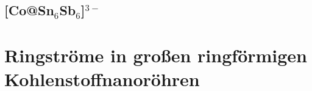 %
%
%

\FloatBarrier
\subsection{\texorpdfstring{[Co@Sn$_6$Sb$_6$]$^{3-}$}{[Co at Sn\_6Sb\_6\^3-]}}
\FloatBarrier
\section{Ringströme in großen ringförmigen Kohlenstoffnanoröhren}